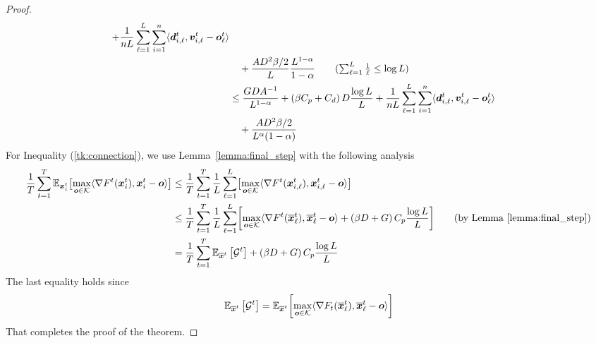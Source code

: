 \begin{proof}
\begin{align*}
        + \frac{1}{nL} \sum_{\ell=1}^{L}\sum_{i=1}^{n} \langle \vect{d}^t_{i,\ell}, \vect{v}^t_{i,\ell} - \vect{o}^t_{\ell} \rangle \\  
        & \quad + \frac{AD^2 \beta/2}{L} \frac{L^{1-\alpha}}{1-\alpha} \tag{$\sum_{\ell=1}^{L} \frac{1}{\ell} \leq \log L$} \\
        & \leq \frac{GDA^{-1}}{L^{1-\alpha}} 
        + \left( \beta C_p + C_d \right)D\frac{\log L}{L}
        + \frac{1}{nL}\sum_{\ell=1}^{L}\sum_{i=1}^{n}\langle \vect{d}^t_{i,\ell}, \vect{v}^t_{i,\ell} - \vect{o}^t_{\ell} \rangle \\
        & \quad + \frac{AD^2 \beta/2}{L^{\alpha}(1-\alpha)} 
    \end{align*}
%
For Inequality (\ref{tk:connection}), we use Lemma~\ref{lemma:final_step} with the following analysis
    \begin{align*}	%
    \frac{1}{T}\sum_{t=1}^{T} \E_{\vect{x}^t_i} \bigl [ \max_{\vect{o} \in \mathcal{K}}\langle \nabla F^{t}(\vect{x}^t_{i}), \vect{x}^t_{i} - \vect{o}\rangle \bigr] 
    & \leq \frac{1}{T}\sum_{t=1}^{T} \frac{1}{L} \sum_{\ell=1}^{L} \bigl [ \max_{\vect{o} \in \mathcal{K}}\langle \nabla F^{t}(\vect{x}^t_{i,\ell}), \vect{x}^t_{i,\ell} - \vect{o}\rangle \bigr] \\
    & \leq \frac{1}{T}\sum_{t=1}^{T} \frac{1}{L} \sum_{\ell=1}^{L} \biggl[ \max_{\vect{o} \in \mathcal{K}}
    		\langle \nabla F^{t} (\overline{\vect{x}}^t_{\ell}), \overline{\vect{x}}^t_{\ell} - \vect{o} \rangle \notag 
    +  \left(\beta D + G \right)C_p \frac{\log L}{L}
    		\biggr]  \tag{by Lemma \ref{lemma:final_step}} \\
    &= \frac{1}{T}\sum_{t=1}^{T} \E_{\overline{\vect{x}}^t} \left[\mathcal{G}^t\right] +  \left(\beta D + G \right) C_p \frac{\log L}{L} 	
    \end{align*}
The last equality holds since 
     \begin{align*}
    \mathbb{E}_{\overline{\bm{x}}^t} \left[\mathcal{G}^t\right] = \mathbb{E}_{\overline{\bm{x}}^t} {\left[\max_{\bm{o} \in \mathcal{K}}\langle \nabla F_t (\overline{\bm{x}}^t_{\ell}), \overline{\bm{x}}^t_{\ell} - \bm{o} \rangle \right]}
    \end{align*}
 That completes the proof of the theorem.
\end{proof}


